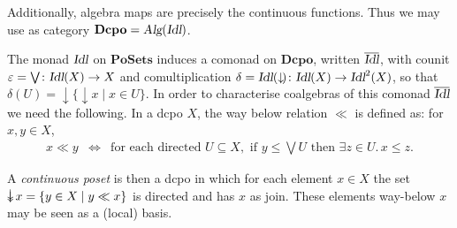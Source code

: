 \documentclass{LMCS}
\newcommand{\Cat}[1]{\ensuremath{\mathbf{#1}}}
\newcommand{\Alg}{\textsl{Alg}\xspace}
\newcommand{\Idl}{\textsl{Idl}\xspace}
\newcommand{\PoSets}{\Cat{PoSets}\xspace}
\newcommand{\Dcpo}{\Cat{Dcpo}\xspace}
\newcommand{\set}[2]{\{#1\;|\;#2\}}
\newcommand{\setin}[3]{\{#1\in#2\;|\;#3\}}
\newcommand{\exin}[3]{\exists{#1\in#2}.\,#3}
\newcommand{\downset}{\mathop{\downarrow}\!}
\def\ddownset{\mathop{\rlap{$\downarrow$}\raisebox{.4ex}{$\downarrow$}}}
\begin{document}
\noindent Additionally, algebra maps are precisely the continuous
functions. Thus we may use as category $\Dcpo = \Alg(\Idl)$.

The monad $\Idl$ on $\PoSets$ induces a comonad on $\Dcpo$, written
$\overline{\Idl}$, with counit $\varepsilon = \bigvee \colon \Idl(X)
\rightarrow X$ and comultiplication $\delta = \Idl(\downset) \colon
\Idl(X)\rightarrow \Idl^{2}(X)$, so that $\delta(U) =
\downset\set{\downset x}{x\in U}$. In order to characterise coalgebras
of this comonad $\overline{\Idl}$ we need the following. In a dcpo
$X$, the way below relation $\ll$ is defined as: for $x,y \in X$,
$$\begin{array}{rcl}
x \ll y
& \Longleftrightarrow &
\mbox{for each directed }U\subseteq X, \mbox{ if } 
      y\leq {\textstyle \bigvee U} \mbox{ then }
      \exin{z}{U}{x\leq z}.
\end{array}$$

\noindent A \emph{continuous poset} is then a dcpo in which for each
element $x\in X$ the set $\ddownset x = \setin{y}{X}{y \ll x}$ is
directed and has $x$ as join. These elements way-below $x$ may be seen
as a (local) basis.
\end{document}
